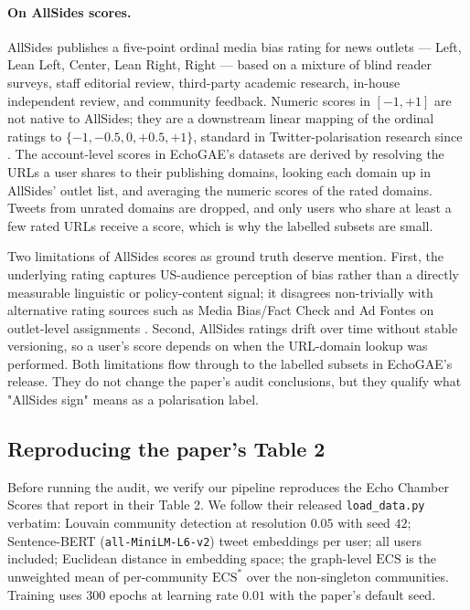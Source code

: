 \paragraph{On AllSides scores.} AllSides
\citep{AllSidesMethods} publishes a five-point ordinal media bias
rating for news outlets --- Left, Lean Left, Center, Lean Right,
Right --- based on a mixture of blind reader surveys, staff
editorial review, third-party academic research, in-house
independent review, and community feedback. Numeric scores in
$[-1, +1]$ are not native to AllSides; they are a downstream
linear mapping of the ordinal ratings to $\{-1, -0.5, 0, +0.5,
+1\}$, standard in Twitter-polarisation research since
\citet{BakshyMessingAdamic2015}. The account-level scores in
EchoGAE's datasets are derived by resolving the URLs a user shares
to their publishing domains, looking each domain up in AllSides'
outlet list, and averaging the numeric scores of the rated
domains. Tweets from unrated domains are dropped, and only users
who share at least a few rated URLs receive a score, which is why
the labelled subsets are small.

Two limitations of AllSides scores as ground truth deserve
mention. First, the underlying rating captures US-audience
perception of bias rather than a directly measurable linguistic or
policy-content signal; it disagrees non-trivially with
alternative rating sources such as Media Bias/Fact Check and Ad
Fontes on outlet-level assignments
\citep{PoynterMediaBiasCharts, SpindeMediaBias2021}. Second,
AllSides ratings drift over time without stable versioning, so a
user's score depends on when the URL-domain lookup was performed.
Both limitations flow through to the labelled subsets in EchoGAE's
release. They do not change the paper's audit conclusions, but
they qualify what "AllSides sign" means as a polarisation label.

\subsection{Reproducing the paper's Table 2}\label{sec:emp-repro}

Before running the audit, we verify our pipeline reproduces the
Echo Chamber Scores that \citet{Alatawi23EchoGAE} report in their
Table 2. We follow their released \texttt{load\_data.py}
verbatim: Louvain community detection at resolution $0.05$ with
seed $42$; Sentence-BERT (\texttt{all-MiniLM-L6-v2}) tweet
embeddings per user; all users included; Euclidean distance in
embedding space; the graph-level $\mathrm{ECS}$ is the unweighted
mean of per-community $\mathrm{ECS}^*$ over the non-singleton
communities. Training uses $300$ epochs at learning rate $0.01$
with the paper's default seed.

